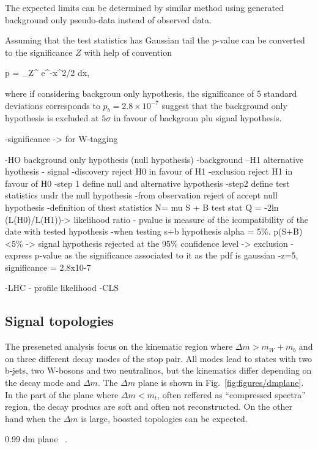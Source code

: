 The expected limits can be determined by similar method using generated background only pseudo-data instead of observed data. 

Assuming that the test statistics has Gaussian tail  the p-value can be converted to the significance $Z$ with help of convention

{
 p = \int_Z^{\infty}  e^{-x^{2}/2} dx,
}

where if considering backgroun only hypothesis, the significance of 5 standard deviations corresponds to $p_{b} = 2.8 \times 10^{-7} $ suggest that the background only hypothesis is excluded at $5 \sigma$ in favour of backgroun plu signal hypothesis. %


-significance -> for W-tagging

-HO background only hypothesis (null hypothesis) -background
--H1 alternative hyothesis - signal
-discovery reject H0 in favour of H1
-exclusion reject H1 in favour of H0
-step 1 define null and alternative hypothesis
-step2 define test statistics undr the null hypothesis
-from observation reject of accept null hypothesis
-definition of thest statistics
	N= mu S + B
	test stat Q = -2ln (L(H0)/L(H1))-> likelihood ratio
- pvalue is measure of the icompatibility of the date with tested hypothesis
-when testing s+b hypothesis alpha = 5\%. p(S+B)<5\% -> signal hypothesis rejected at the 95\% confidence level -> exclusion
- express p-value as the significance associated to it as the pdf is gaussian
-z=5, significance = 2.8x10-7

-LHC - profile likelihood
-CLS~\cite{Read:2002hq, Junk:1999kv}

\subsection{Signal topologies}

The preseneted analysis focus on the kinematic region where $\Delta m > m_W+m_b$ and on three different decay modes of the stop pair.  All modes lead to states with two b-jets, two W-bosons and two neutralinos, but the kinematics differ depending on the decay mode and $\Delta m$. The $\Delta m$ plane is shown in Fig.~\ref{fig:figures/dmplane}. In the part of the plane where $\Delta m < m_t$, often reffered as ``compressed spectra'' region, the decay producs are soft and often not reconstructed. On the other hand when the $\Delta m$ is large, boosted topologies can be expected. 

                 {0.99}       %
                 { dm plane ~\cite{Aad:2014kra}. }

